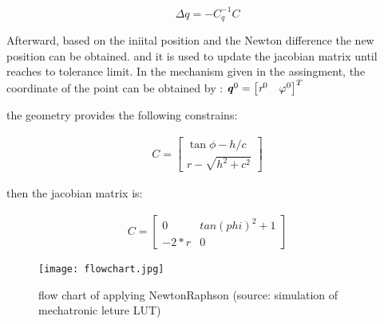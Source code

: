 \documentclass[letterpaper,10pt]{article} %
\begin{document}
\begin{equation}
	\Delta q = -C_q^{-1}C
\label{eq:deltaq}
\end{equation}


Afterward, based on the iniital position and the Newton difference the new position can be obtained. and it is used to update the jacobian matrix until reaches to tolerance limit. In the mechanism given in the assingment, the coordinate of the point can be obtained by : $\textbf{\textit{q}}^{0}=\begin{bmatrix}
\textit{r}^{0} & \varphi^{0}
\end{bmatrix}^{T}$

the geometry provides the following constrains:


 \begin{eqnarray*}
	C = \begin{bmatrix} 
		\tan\phi-h/c \\
		r-\sqrt{h^2+c^2}
	\end{bmatrix}
\end{eqnarray*} 

then the jacobian matrix is:



 \begin{eqnarray*}
	C = \begin{bmatrix} 
		0& tan(phi)^2 + 1 \\
	-2*r&              0
	\end{bmatrix}
\end{eqnarray*}

	
	\begin{figure}[Ht]
		\centering
		\texttt{[image: flowchart.jpg]}
		\caption{flow chart of applying NewtonRaphson (source: simulation of mechatronic leture LUT)}
		\label{fig:flowchart}
	\end{figure}
	
\end{document}
